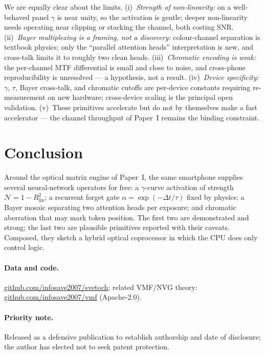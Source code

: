 \documentclass[11pt]{article}
\begin{document}
We are equally clear about the limits. (i)~\emph{Strength of non-linearity:} on a well-behaved
panel $\gamma$ is near unity, so the activation is gentle; deeper non-linearity needs operating
near clipping or stacking the channel, both costing SNR. (ii)~\emph{Bayer multiplexing is a
framing, not a discovery:} colour-channel separation is textbook physics; only the ``parallel
attention heads'' interpretation is new, and cross-talk limits it to roughly two clean heads.
(iii)~\emph{Chromatic encoding is weak:} the per-channel MTF differential is small and close to
noise, and cross-phone reproducibility is unresolved --- a hypothesis, not a result.
(iv)~\emph{Device specificity:} $\gamma$, $\tau$, Bayer cross-talk, and chromatic cutoffs are
per-device constants requiring re-measurement on new hardware; cross-device scaling is the
principal open validation. (v)~These primitives accelerate but do not by themselves make a fast
accelerator --- the channel throughput of Paper~I remains the binding constraint.

\section{Conclusion}
Around the optical matrix engine of Paper~I, the same smartphone supplies several
neural-network operators for free: a $\gamma$-curve activation of strength
$\mathcal{N}=1-R^2_\text{lin}$; a recurrent forget gate $\alpha=\exp(-\Delta t/\tau)$ fixed by
physics; a Bayer mosaic separating two attention heads per exposure; and chromatic aberration
that may mark token position. The first two are demonstrated and strong; the last two are
plausible primitives reported with their caveats. Composed, they sketch a hybrid optical
coprocessor in which the CPU does only control logic.

\paragraph{Data and code.} \href{https://github.com/infosave2007/svetoch}{github.com/infosave2007/svetoch}; related VMF/NVG theory: \href{https://github.com/infosave2007/vmf}{github.com/infosave2007/vmf}
(Apache-2.0).
\paragraph{Priority note.} Released as a defensive publication to establish authorship and date
of disclosure; the author has elected not to seek patent protection.
\end{document}
